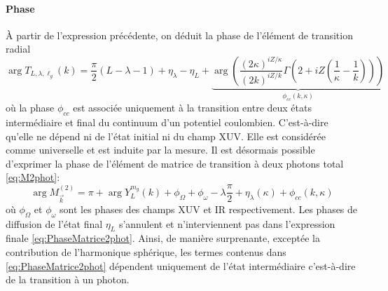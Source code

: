 \paragraph*{Phase} \`{A} partir de l'expression précédente, on déduit la phase de l'élément de transition radial
\begin{equation}
\arg T_{L,\lambda,\ell_g}(k) = \frac{\pi}{2} (L-\lambda -1) + \eta_\lambda - \eta_L + \underbrace{\arg \left(\frac{(2\kappa)^{iZ/\kappa}}{(2k)^{iZ/k}} \Gamma(2+iZ(\frac{1}{\kappa}-\frac{1}{k})) \right)}_{\phi_{cc}(k,\kappa)}
\end{equation}
où la phase $\phi_{cc}$ est associée uniquement à la transition entre deux états intermédiaire et final du continuum d'un potentiel coulombien. C'est-à-dire qu'elle ne dépend ni de l'état initial ni du champ XUV. Elle est considérée comme universelle  et est induite par la mesure.
Il est désormais possible d'exprimer la phase de l'élément de matrice de transition à deux photons total \ref{eq:M2phot}:
\begin{equation}
\arg M_{\vec{k}}^{(2)} = \pi + \arg Y_{L}^{m_g}(k) + \phi_\Omega + \phi_\omega - \lambda \frac{\pi}{2} + \eta_\lambda (\kappa) + \phi_{cc}(k,\kappa)
\label{eq:PhaseMatrice2phot}
\end{equation}
où $\phi_\Omega$ et $\phi_\omega$ sont les phases des champs XUV et IR respectivement. Les phases de diffusion de l'état final $\eta_L$ s'annulent et n'interviennent pas dans l'expression finale \ref{eq:PhaseMatrice2phot}. Ainsi, de manière surprenante, exceptée la contribution de l'harmonique sphérique, les termes contenus dans \ref{eq:PhaseMatrice2phot} dépendent uniquement de l'état intermédiaire c'est-à-dire de la transition à un photon.

